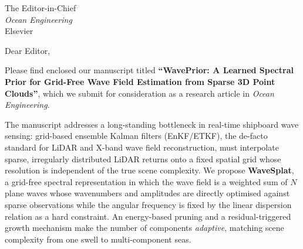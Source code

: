 \documentclass[11pt,a4paper]{letter}
\date{April 10, 2026}
\begin{document}
\begin{letter}{The Editor-in-Chief \\ \textit{Ocean Engineering} \\ Elsevier}

\opening{Dear Editor,}

Please find enclosed our manuscript titled \textbf{``WavePrior: A
Learned Spectral Prior for Grid-Free Wave Field Estimation from Sparse
3D Point Clouds''}, which we submit for consideration as a
research article in \textit{Ocean Engineering}.

The manuscript addresses a long-standing bottleneck in real-time
shipboard wave sensing: grid-based ensemble Kalman filters
(EnKF/ETKF), the de-facto standard for LiDAR and X-band wave field
reconstruction, must interpolate sparse, irregularly distributed
LiDAR returns onto a fixed spatial grid whose resolution is
independent of the true scene complexity. We propose
\textbf{WaveSplat}, a grid-free spectral representation in which the
wave field is a weighted sum of $N$ plane waves whose wavenumbers
and amplitudes are directly optimised against sparse observations
while the angular frequency is fixed by the linear dispersion
relation as a hard constraint. An energy-based pruning and a
residual-triggered growth mechanism make the number of components
\emph{adaptive}, matching scene complexity from one swell to
multi-component seas.


\end{letter}
\end{document}
